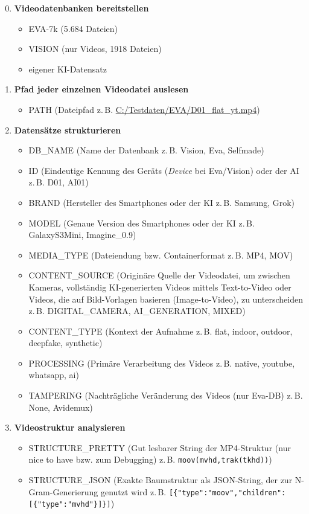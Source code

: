 \begin{enumerate}
    \setcounter{enumi}{-1}
    \item \textbf{Videodatenbanken bereitstellen}
    \begin{itemize}
        \item EVA-7k (5.684 Dateien)
        \item VISION (nur Videos, 1918 Dateien)
        \item eigener KI-Datensatz
    \end{itemize}
    
    \item \textbf{Pfad jeder einzelnen Videodatei auslesen}
    \begin{itemize}
        \item PATH (Dateipfad z.\,B. \url{C:/Testdaten/EVA/D01_flat_yt.mp4})
    \end{itemize}
    
    \item \textbf{Datensätze strukturieren}
    \begin{itemize}
        \item DB\_NAME (Name der Datenbank z.\,B. Vision, Eva, Selfmade)
        \item ID (Eindeutige Kennung des Geräts (\textit{Device} bei Eva/Vision) oder der AI z.\,B. D01, AI01)
        \item BRAND (Hersteller des Smartphones oder der KI z.\,B. Samsung, Grok)
        \item MODEL (Genaue Version des Smartphones oder der KI z.\,B. GalaxyS3Mini, Imagine\_0.9)
        \item MEDIA\_TYPE (Dateiendung bzw. Containerformat z.\,B. MP4, MOV)
        \item CONTENT\_SOURCE (Originäre Quelle der Videodatei, um zwischen Kameras, vollständig KI-generierten Videos mittels Text-to-Video oder Videos, die auf Bild-Vorlagen basieren (Image-to-Video), zu unterscheiden z.\,B. DIGITAL\_CAMERA, AI\_GENERATION, MIXED)
        \item CONTENT\_TYPE (Kontext der Aufnahme z.\,B. flat, indoor, outdoor, deepfake, synthetic)
        \item PROCESSING (Primäre Verarbeitung des Videos z.\,B. native, youtube, whatsapp, ai)
        \item TAMPERING (Nachträgliche Veränderung des Videos (nur Eva-DB) z.\,B. None, Avidemux)
    \end{itemize}
    
    \item \textbf{Videostruktur analysieren}
    \begin{itemize}
        \item STRUCTURE\_PRETTY (Gut lesbarer String der MP4-Struktur (nur nice to have bzw. zum Debugging) z.\,B. \texttt{moov(mvhd,trak(tkhd))})
        \item STRUCTURE\_JSON (Exakte Baumstruktur als JSON-String, der zur N-Gram-Generierung genutzt wird z.\,B. \verb|[{"type":"moov","children":[{"type":"mvhd"}]}]|)
    \end{itemize}
    

\end{enumerate}
